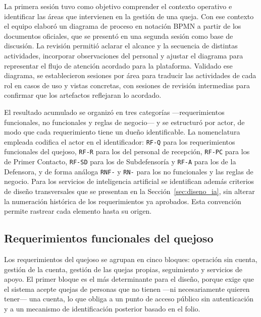 	La primera sesión tuvo como objetivo comprender el contexto operativo e identificar las áreas
	que intervienen en la gestión de una queja. Con ese contexto el equipo elaboró un diagrama de
	proceso en notación BPMN a partir de los documentos oficiales, que se presentó en una segunda
	sesión como base de discusión. La revisión permitió aclarar el alcance y la secuencia de distintas actividades,
	incorporar observaciones del personal y ajustar el diagrama para representar el flujo
	de atención acordado para la plataforma. Validado ese diagrama, se establecieron
	sesiones por área para traducir las actividades de cada rol en casos de uso y vistas concretas,
	con sesiones de revisión intermedias para confirmar que los artefactos reflejaran lo acordado.
	
	El resultado acumulado se organizó en tres categorías ---requerimientos funcionales, no
	funcionales y reglas de negocio--- y se estructuró por actor, de modo que cada requerimiento
	tiene un dueño identificable. La nomenclatura empleada codifica el actor en el identificador:
	\texttt{RF-Q} para los requerimientos funcionales del quejoso, \texttt{RF-R} para los del
	personal de recepción, \texttt{RF-PC} para los de Primer Contacto, \texttt{RF-SD} para los de
	Subdefensoría y \texttt{RF-A} para los de la Defensora, y de forma análoga
	\texttt{RNF-} y \texttt{RN-} para los no funcionales y las reglas de negocio. Para los
	servicios de inteligencia artificial se identifican además criterios de diseño transversales
	que se presentan en la Sección~\ref{sec:diseno_ia}, sin alterar la numeración histórica de los
	requerimientos ya aprobados. Esta convención permite rastrear cada elemento hasta su origen.
	
	\subsection{Requerimientos funcionales del quejoso}
	Los requerimientos del quejoso se agrupan en cinco bloques: operación sin cuenta, gestión de la
	cuenta, gestión de las quejas propias, seguimiento y servicios de apoyo. El primer bloque es el
	más determinante para el diseño, porque exige que el sistema acepte quejas de personas que no
	tienen ---ni necesariamente quieren tener--- una cuenta, lo que obliga a un punto de acceso
	público sin autenticación y a un mecanismo de identificación posterior basado en el folio.
	
	\small
	\renewcommand{\arraystretch}{1.2}
	\setlength{\tabcolsep}{4pt}
	
